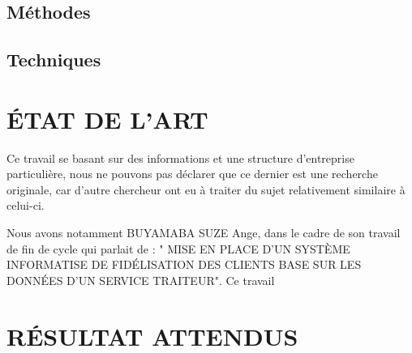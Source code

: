 \documentclass[a4paper,12pt,oneside]{book}
\begin{document}
        \subsection[Méthodes]{Méthodes}
        \subsection[Techniques]{Techniques}


    \section[Etat de l'art]{ÉTAT DE L’ART}
    Ce travail se basant sur des informations et une structure d’entreprise particulière, nous ne
    pouvons pas déclarer que ce dernier est une recherche originale, car d’autre chercheur ont eu
    à traiter du sujet relativement similaire à celui-ci.
    \newline

    Nous avons notamment BUYAMABA SUZE Ange, dans le cadre de son travail de fin de cycle
    qui parlait de : " MISE EN PLACE D’UN SYSTÈME INFORMATISE DE FIDÉLISATION DES CLIENTS BASE SUR LES
    DONNÉES D’UN SERVICE TRAITEUR". Ce travail \cite[prenote][postnote]{Buyamba2017}
    \section[Résultats attenus]{RÉSULTAT ATTENDUS}


\mainmatter

    \printbibliography
\end{document}
